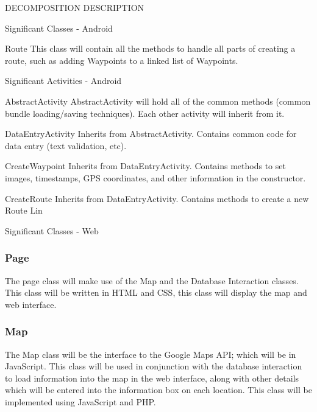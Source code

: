 \documentclass{article}
\begin{document}
\begin{section}{DECOMPOSITION DESCRIPTION}
\begin{subsection}{Significant Classes - Android}
		    \begin{subsubsection}{Route}
		    This class will contain all the methods to handle all parts of creating a route, such as adding Waypoints to a linked list of Waypoints.
		    \end{subsubsection}
	    \end{subsection}
	    
	    \begin{subsection}{Significant Activities - Android}
	    	\begin{subsubsection}{AbstractActivity}
		    AbstractActivity will hold all of the common methods (common bundle loading/saving techniques). Each other activity will inherit from it.
		    \end{subsubsection}
		    
		    \begin{subsubsection}{DataEntryActivity}
		    Inherits from AbstractActivity. Contains common code for data entry (text validation, etc).
		    \end{subsubsection}
		    
		    \begin{subsubsection}{CreateWaypoint}
		    Inherits from DataEntryActivity. Contains methods to set images, timestamps, GPS coordinates, and other information in the constructor.
		    \end{subsubsection}
		    
		    \begin{subsubsection}{CreateRoute}
		    Inherits from DataEntryActivity. Contains methods to create a new Route Lin
		    \end{subsubsection}
	    \end{subsection}
	
	    \begin{subsection}{Significant Classes - Web}
		    \subsubsection{Page}
		    The page class will make use of the Map and the Database Interaction classes. This class will be written in HTML and CSS, this class will display the map and web interface.

		    \subsubsection{Map}
		    The Map class will be the interface to the Google Maps API; which will be in JavaScript. This class will be used in conjunction with the database interaction to load information into the map in the web interface, along with other details which will be entered into the information box on each location. This class will be implemented using JavaScript and PHP.


\end{subsection}
\end{section}
\end{document}
